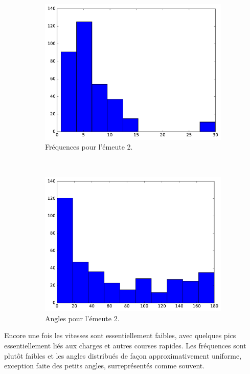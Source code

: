 \begin{figure}[htb]
\begin{subfigure}[t]{\subImgWclicks}
			\centering
			\includegraphics[width=\textwidth]{figures/ch3/riot2a_frequency}
			\caption{Fréquences pour l'émeute 2.}
			\label{fig:riot2a_frequency}
		\end{subfigure}
		~
		\begin{subfigure}[t]{\subImgWclicks}
			\centering
			\includegraphics[width=\textwidth]{figures/ch3/riot2a_angle}
			\caption{Angles pour l'émeute 2.}
			\label{fig:riot2a_angle}
		\end{subfigure}
		\caption[Histogrammes, émeutes]{}
		\label{fig:histRiots}
	\end{figure}

	Encore une fois les vitesses sont essentiellement faibles, avec quelques pics essentiellement liés aux charges et autres courses rapides. Les fréquences sont plutôt faibles et les angles distribués de façon approximativement uniforme, exception faite des petits angles, surreprésentés comme souvent.
	
